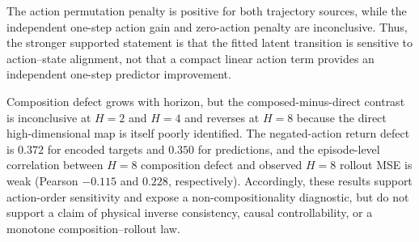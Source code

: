 \documentclass{article}
\begin{document}
The action permutation penalty is positive for both trajectory sources, while
the independent one-step action gain and zero-action penalty are inconclusive.
Thus, the stronger supported statement is that the fitted latent transition is
sensitive to action--state alignment, not that a compact linear action term
provides an independent one-step predictor improvement.

\begin{table}[H]
\centering
\scriptsize
\setlength{\tabcolsep}{3pt}
\caption{Action composition and inverse-proxy diagnostics. Composition defect
is defined in Eq.~\eqref{eq:supp-action-composition-defect}; the final column
is the mean Eq.~\eqref{eq:supp-action-inverse-proxy}. The composed-minus-direct
MSE contrasts use the same held-out windows.}
\label{tab:supp-action-algebra-composition}
\end{table}

Composition defect grows with horizon, but the composed-minus-direct contrast
is inconclusive at $H=2$ and $H=4$ and reverses at $H=8$ because the direct
high-dimensional map is itself poorly identified. The negated-action return
defect is $0.372$ for encoded targets and $0.350$ for predictions, and the
episode-level correlation between $H=8$ composition defect and observed
$H=8$ rollout MSE is weak (Pearson $-0.115$ and $0.228$, respectively).
Accordingly, these results support action-order sensitivity and expose a
non-compositionality diagnostic, but do not support a claim of physical inverse
consistency, causal controllability, or a monotone composition--rollout law.
\end{document}
